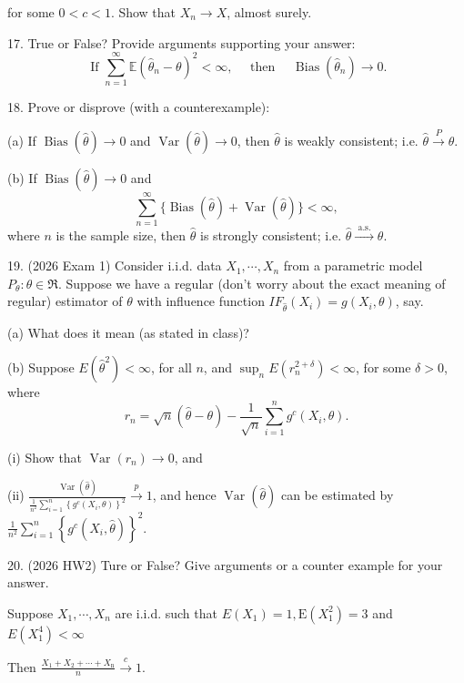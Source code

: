 \documentclass[11pt]{article}
\theoremstyle{definition}
\begin{document}
for some $0<c<1$.
Show that $X_n \rightarrow X$, almost surely.

17. True or False? Provide arguments supporting your answer:
$$
\text { If } \sum_{n=1}^{\infty} \mathbb{E}\left(\hat{\theta}_n-\theta\right)^2<\infty, \quad \text { then } \quad \operatorname{Bias}\left(\hat{\theta}_n\right) \rightarrow 0 .
$$

18. Prove or disprove (with a counterexample):

(a) If $\operatorname{Bias}(\hat{\theta}) \rightarrow 0$ and $\operatorname{Var}(\hat{\theta}) \rightarrow 0$, then $\hat{\theta}$ is weakly consistent; i.e. $\hat{\theta} \xrightarrow{P} \theta$.

(b) If $\operatorname{Bias}(\hat{\theta}) \rightarrow 0$ and
$$
\sum_{n=1}^{\infty}\{\operatorname{Bias}(\hat{\theta})+\operatorname{Var}(\hat{\theta})\}<\infty,
$$
where $n$ is the sample size, then $\hat{\theta}$ is strongly consistent; i.e. $\hat{\theta} \xrightarrow{\text { a.s. }} \theta$.

19. (2026 Exam 1) Consider i.i.d. data $X_1, \cdots, X_n$ from a parametric model $P_\theta: \theta \in \Re$. Suppose we have a regular (don't worry about the exact meaning of regular) estimator of $\theta$ with influence function $I F_{\widehat{\theta}}\left(X_i\right)=g\left(X_i, \theta\right)$, say.

(a) What does it mean (as stated in class)?

(b) Suppose $E\left(\widehat{\theta}^2\right)<\infty$, for all $n$, and $\sup _n E\left(r_n^{2+\delta}\right)<\infty$, for some $\delta>0$, where
$$
r_n=\sqrt{n}(\hat{\theta}-\theta)-\frac{1}{\sqrt{n}} \sum_{i=1}^n g^c\left(X_i, \theta\right) .
$$

(i) Show that $\operatorname{Var}\left(r_n\right) \rightarrow 0$, and

(ii) $\frac{\operatorname{Var}(\widehat{\theta})}{\frac{1}{n^2} \sum_{i=1}^n\left\{g^c\left(X_i, \theta\right)\right\}^2} \xrightarrow{p} 1$, and hence $\operatorname{Var}(\widehat{\theta})$ can be estimated by $\frac{1}{n^2} \sum_{i=1}^n\left\{g^c\left(X_i, \widehat{\theta}\right)\right\}^2$.

20. (2026 HW2) Ture or False? Give arguments or a counter example for your answer.

Suppose $X_1, \cdots, X_n$ are i.i.d. such that $E\left(X_1\right)=1, \mathrm{E}\left(X_1^2\right)=3$ and $E(X_1^4)<\infty$

Then $\frac{X_1+X_2+\cdots+X_{\mathrm{n}}}{n} \xrightarrow{c} 1$.
\end{document}
